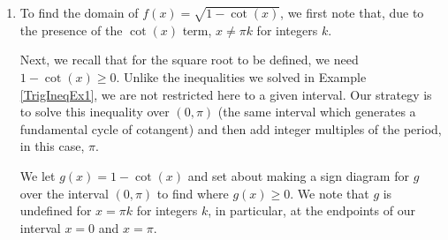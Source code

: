 \documentclass{ximera}
\begin{document}
\begin{example}
\begin{explanation}
\begin{enumerate}
\[ \bigcup_{k = -\infty}^{\infty} \left(a_k, b_k  \right)\cup \left(b_k, a_{k+1}  \right) =  \bigcup_{k = -\infty}^{\infty} \left(\frac{(6k+1)\pi}{3}, \frac{(6k+5) \pi}{3}  \right)\cup \left(\frac{(6k+5) \pi}{3}, \frac{(6k+7)\pi}{3}  \right) \]

A second approach to the problem exploits the periodic nature of $f$.  Since $\cos(t)$ and $\sin(t)$ have period $2\pi$, it's not too difficult to show the function $f$ repeats itself every $2\pi$ units.\footnote{This doesn't necessarily mean the period of $f$ is $2\pi$.  The tangent function is comprised of sine and cosine, but its period is half theirs.  The reader is invited to investigate the period of $f$.}  This means if we can find a formula for the domain on an interval of length $2\pi$, we can express the entire domain by translating our answer left and right on the $t$-axis by adding integer multiples of $2\pi$.

 

 One such interval that arises naturally from our domain work is  $\left[\frac{\pi}{3}, \frac{7\pi}{3}\right]$. The portion of the domain here is  $\left(\frac{\pi}{3}, \frac{5\pi}{3}\right) \cup \left(\frac{5\pi}{3}, \frac{7\pi}{3}\right)$.  Adding integer multiples of $2\pi$, we obtain the family of intervals:    $\left(\frac{\pi}{3} + 2\pi k, \frac{5\pi}{3} + 2\pi k \right) \cup \left(\frac{5\pi}{3} + 2\pi k, \frac{7\pi}{3} + 2\pi k\right)$ for integers $k$.  We leave it to the reader to show that getting common denominators leads to our previous answer.


\item  To find the domain of $f(x) = \sqrt{1-\cot(x)}$, we first note that, due to the presence of the $\cot(x)$ term, $x \neq \pi k$ for integers $k$.  

 

Next, we recall that for the square root to be defined, we need $1 - \cot(x) \geq 0$.  Unlike the inequalities we solved in Example \ref{TrigIneqEx1}, we are not restricted here to a given interval.  Our strategy is to solve this inequality over $(0,\pi)$  (the same interval which generates a fundamental cycle of cotangent) and then add integer multiples of the period, in this case, $\pi$.  

 

We let $g(x) = 1 - \cot(x)$ and set about making a sign diagram for $g$ over the interval $(0,\pi)$ to find where $g(x) \geq 0$.  We note that $g$ is undefined for $x = \pi k$ for integers $k$, in particular, at the endpoints of our interval $x = 0$ and $x = \pi$. 


\end{enumerate}
\end{explanation}
\end{example}
\end{document}
